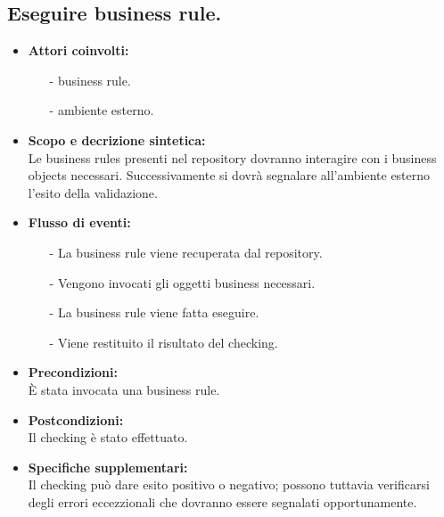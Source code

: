 \documentclass[11pt,titlepage,a4paper]{report}
\begin{document}
\subsection{Eseguire business rule.}
\begin{itemize}
\item{\textbf{Attori coinvolti:}}
\begin{itemize}
\item[-] business rule.
\item[-] ambiente esterno.
\end{itemize}
\item{\textbf{Scopo e decrizione sintetica:}}\\
Le business rules presenti nel repository dovranno interagire con i business objects necessari. Successivamente si dovr\`a segnalare all'ambiente esterno l'esito della validazione.
\item{\textbf{Flusso di eventi:}}
\begin{itemize}
 \item[-] {La business rule viene recuperata dal repository.}
 \item[-] {Vengono invocati gli oggetti business necessari.}
 \item[-] {La business rule viene fatta eseguire.}
 \item[-] {Viene restituito il risultato del checking.}
\end{itemize}
\item{\textbf{Precondizioni:}}\\
\`E stata invocata una business rule.
\item{\textbf{Postcondizioni:}}\\
Il checking \`e stato effettuato.
\item\textbf{{Specifiche supplementari:}}\\
Il checking pu\`o dare esito positivo o negativo; possono tuttavia verificarsi degli errori eccezzionali che dovranno essere segnalati opportunamente.
\end{itemize}
\end{document}

